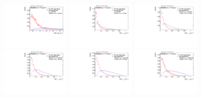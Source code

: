 \begin{figure}
\includegraphics[width=0.3\textwidth]{sascha_input/Appendix/Distributions/w/distributions/beta17/h_assisted_tj_D2_17_bin6.pdf}
\bigskip 
\includegraphics[width=0.3\textwidth]{sascha_input/Appendix/Distributions/w/distributions/beta17/h_assisted_tj_nSub21_17_bin1.pdf} \hspace{1mm}
\includegraphics[width=0.3\textwidth]{sascha_input/Appendix/Distributions/w/distributions/beta17/h_assisted_tj_nSub21_17_bin2.pdf} \hspace{1mm}
\includegraphics[width=0.3\textwidth]{sascha_input/Appendix/Distributions/w/distributions/beta17/h_assisted_tj_nSub21_17_bin3.pdf} 
\bigskip
\includegraphics[width=0.3\textwidth]{sascha_input/Appendix/Distributions/w/distributions/beta17/h_assisted_tj_nSub21_17_bin4.pdf} \hspace{6mm}
\includegraphics[width=0.3\textwidth]{sascha_input/Appendix/Distributions/w/distributions/beta17/h_assisted_tj_nSub21_17_bin5.pdf} \hspace{6mm}

\end{figure}
